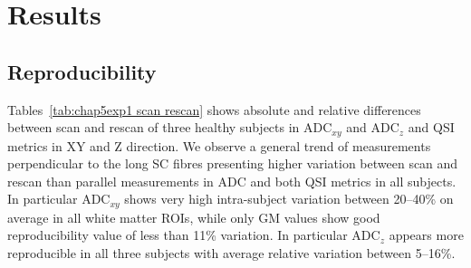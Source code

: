 \section{Results}
\subsection{Reproducibility}
\label{par:chapter5 exp1 reproducibility}
Tables~\ref{tab:chap5exp1 scan rescan} shows absolute and relative differences between scan and rescan of three healthy subjects in ADC$_{xy}$ and ADC$_z$ and \gls{QSI} metrics in XY and Z direction. We observe a general trend of measurements perpendicular to the long \gls{SC} fibres presenting higher variation between scan and rescan than parallel measurements in \gls{ADC} and both \gls{QSI} metrics in all subjects. In particular ADC$_{xy}$ shows very high intra-subject variation between 20--40\% on average in all white matter \glspl{ROI}, while only GM values show good reproducibility value of less than 11\% variation. In particular ADC$_z$ appears more reproducible in all three subjects with average relative variation between 5--16\%.


